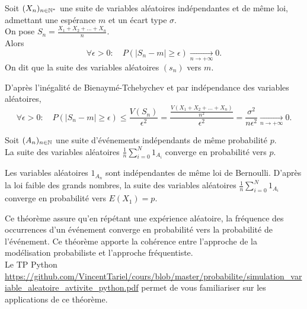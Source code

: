 \documentclass{book}
\begin{document}
\begin{Theoreme}
Soit $(X_n)_{n\in\mathbb{N}^*}$ une suite de variables aléatoires indépendantes et de même loi, admettant une espérance $m$ et un écart
type $\sigma$.\\
On pose $S_n =\frac{X_1+X_2+\dots+X_n}{n}.$\\
Alors 
$$ \forall \epsilon>0: \quad P\left(\left| S_n - m \right|\geq \epsilon \right )\xrightarrow[n\to+\infty]{}0.$$
On dit que la suite des variables aléatoires $(s_n)$  vers $m$. 
\end{Theoreme}
\begin{Demonstration}
D'après l'inégalité de Bienaymé-Tchebychev et par indépendance des variables aléatoires,
$$ \forall \epsilon>0: \quad P\left(\left| S_n - m \right|\geq \epsilon\right)\leq \frac{V(S_n)}{\epsilon^2}=\frac{\frac{V(X_1+X_2+\dots+X_n)}{n^2}}{\epsilon^2}=\frac{\sigma^2}{n\epsilon^2} \xrightarrow[n\to+\infty]{}0.$$
\end{Demonstration}


\begin{Theoreme}
Soit $(A_n)_{n\in\mathbb{N}}$ une suite 
d'événements indépendants de même probabilité $p$.\\
La suite des  
variables aléatoires $\frac 1 n \sum_{i=0}^N 1_{A_i}$ converge en probabilité vers $p$. 
\end{Theoreme}
\begin{Demonstration} Les variables aléatoires $1_{A_n}$ sont  
indépendantes de même loi de Bernoulli. D'après la loi faible des grands nombres, la suite  des  
variables aléatoires $\frac 1 n \sum_{i=0}^N 1_{A_i}$ converge en probabilité vers $E(X_1)=p$.
\end{Demonstration}
\begin{Remarque}
Ce théorème assure qu'en répétant une expérience aléatoire, la fréquence 
des occurrences d'un événement converge en probabilité  
vers la probabilité de l'événement.
Ce théorème apporte la cohérence entre l'approche de la modélisation probabiliste et  
l'approche fréquentiste.\\
Le TP Python \url{https://github.com/VincentTariel/cours/blob/master/probabilite/simulation_variable_aleatoire_avtivite_python.pdf} permet de vous familiariser sur les applications de ce théorème.
\end{Remarque}
\end{document}
